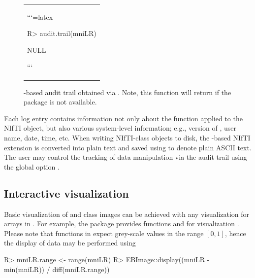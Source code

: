 \documentclass[
]{article}
\begin{document}
\begin{figure}
  \centering
  \begin{tabular}{p{22cm}}
```{=latex}
\begin{CodeChunk}

\begin{CodeInput}
R> audit.trail(mniLR)
\end{CodeInput}

\begin{CodeOutput}
NULL
\end{CodeOutput}
\end{CodeChunk}
```
  \end{tabular}
  \caption{-based audit trail obtained via
    .  Note, this function will return
     if the  package is not available.}
  \label{fig:mniLR-audit-trail}
\end{figure}

Each log entry contains information not only about the function applied
to the NIfTI object, but also various system-level information; e.g.,
version of , user name, date, time, etc. When writing
NIfTI-class objects to disk, the -based NIfTI extension is
converted into plain text and saved using  to denote plain
ASCII text. The user may control the tracking of data manipulation via
the audit trail using the global option .

\subsection{Interactive visualization}

Basic visualization of  and  class images can be
achieved with any visualization for arrays in . For example,
the  package provides functions  and
 for visualization \citep{EBImage}. Please note that
functions in  expect grey-scale values in the range
\([0,1]\), hence the display of  data may be performed using

\begin{CodeChunk}

\begin{CodeInput}
R> mniLR.range <- range(mniLR)
R> EBImage::display((mniLR - min(mniLR)) / diff(mniLR.range))
\end{CodeInput}
\end{CodeChunk}
\end{document}
